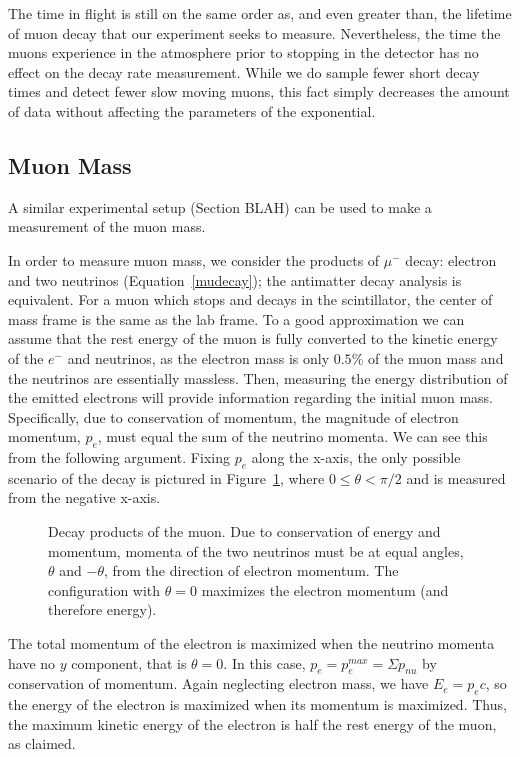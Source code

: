 The time in flight is still on the same order as, and even greater
than, the lifetime of muon decay that our experiment seeks to
measure. Nevertheless, the time the muons experience in the atmosphere
prior to stopping in the detector has no effect on the decay rate
measurement. While we do sample fewer short decay times and detect
fewer slow moving muons, this fact simply decreases the amount of data
without affecting the parameters of the exponential.

\subsection{Muon Mass}\label{muonmass}

A similar experimental setup (Section BLAH) can be used to make a
measurement of the muon mass.

In order to measure muon mass, we consider the products of $\mu^-$
decay: electron and two neutrinos (Equation~\eqref{mudecay}); the
antimatter decay analysis is equivalent. For a muon which stops and
decays in the scintillator, the center of mass frame is the same as
the lab frame. To a good approximation we can assume that the rest
energy of the muon is fully converted to the kinetic energy of the
$e^-$ and neutrinos, as the electron mass is only $0.5\%$ of the muon
mass and the neutrinos are essentially massless. Then, measuring the
energy distribution of the emitted electrons will provide information
regarding the initial muon mass. Specifically, due to conservation of
momentum, the magnitude of electron momentum, $p_e$, must equal the
sum of the neutrino momenta. We can see this from the following
argument. Fixing $p_e$ along the x-axis, the only possible scenario of
the decay is pictured in Figure~\ref{figure:e_nu}, where $0 \leq
\theta <\pi/2$ and is measured from the negative x-axis.

\begin{figure}[ht]
\begin{center}

\caption{\small{Decay products of the muon. Due to conservation of
energy and momentum, momenta of the two neutrinos must be at equal
angles, $\theta$ and $-\theta$, from the direction of electron
momentum. The configuration with $\theta = 0$ maximizes the electron
momentum (and therefore energy).}}
\label{figure:e_nu}
\end{center}
\end{figure}

The total momentum of the electron is maximized when the neutrino
momenta have no $y$ component, that is $\theta = 0$. In this case,
$p_e = p_e^{max} = \Sigma p_{nu}$ by conservation of momentum. Again
neglecting electron mass, we have $E_e = p_ec$, so the energy of the
electron is maximized when its momentum is maximized. Thus, the
maximum kinetic energy of the electron is half the rest energy of the
muon, as claimed.

